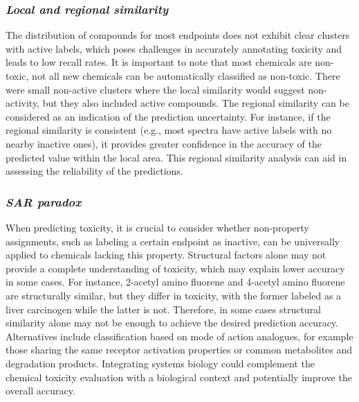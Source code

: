 \subsubsection*{\textit{Local and regional similarity}}

The distribution of compounds for most endpoints does not exhibit clear clusters with active labels, which poses challenges in accurately annotating toxicity and leads to low recall rates. It is important to note that most chemicals are non-toxic, not all new chemicals can be automatically classified as non-toxic. There were small non-active clusters where the local similarity would suggest non-activity, but they also included active compounds. 
The regional similarity can be considered as an indication of the prediction uncertainty. For instance, if the regional similarity is consistent (e.g., most spectra have active labels with no nearby inactive ones), it provides greater confidence in the accuracy of the predicted value within the local area. This regional similarity analysis can aid in assessing the reliability of the predictions.

\subsubsection*{\textit{\ac{SAR} paradox}}

When predicting toxicity, it is crucial to consider whether non-property assignments, such as labeling a certain endpoint as inactive, can be universally applied to chemicals lacking this property. Structural factors alone may not provide a complete understanding of toxicity, which may explain lower accuracy in some cases. For instance, 2-acetyl amino fluorene and 4-acetyl amino fluorene are structurally similar, but they differ in toxicity, with the former labeled as a liver carcinogen while the latter is not. Therefore, in some cases structural similarity alone may not be enough to achieve the desired prediction accuracy. Alternatives include classification based on mode of action analogues, for example those sharing the same receptor activation properties or common metabolites and degradation products. Integrating systems biology could complement the chemical toxicity evaluation with a biological context and potentially improve the overall accuracy.

